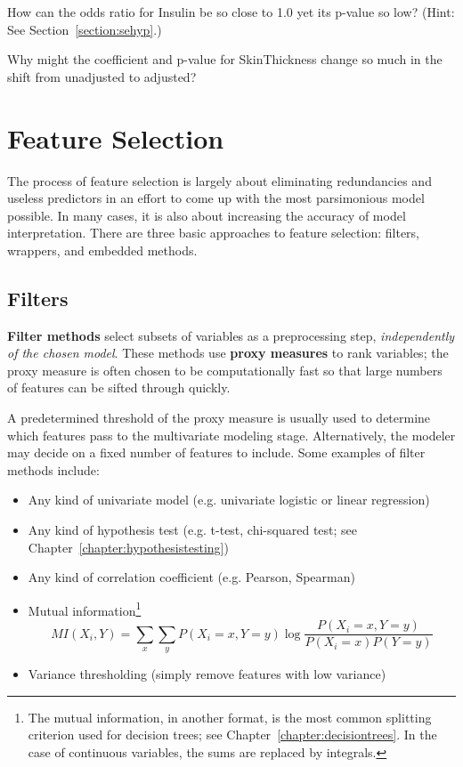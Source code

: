 \begin{question}{}
How can the odds ratio for Insulin be so close to 1.0 yet its p-value so low? (Hint: See Section~\ref{section:sehyp}.)
\end{question}

\begin{question}{}
Why might the coefficient and p-value for SkinThickness change so much in the shift from unadjusted to adjusted? 
\end{question}



\section{Feature Selection}

The process of feature selection is largely about eliminating redundancies and useless predictors in an effort to come up with the most parsimonious model possible. In many cases, it is also about increasing the accuracy of model interpretation. There are three basic approaches to feature selection: filters, wrappers, and embedded methods. 

\subsection{Filters}

\textbf{Filter methods} select subsets of variables as a preprocessing step, \emph{independently of the chosen model}. These methods use \textbf{proxy measures} to rank variables; the proxy measure is often chosen to be computationally fast so that large numbers of features can be sifted through quickly.

A predetermined threshold of the proxy measure is usually used to determine which features pass to the multivariate modeling stage. Alternatively, the modeler may decide on a fixed number of features to include. Some examples of filter methods include:

\begin{itemize}
\item Any kind of univariate model (e.g. univariate logistic or linear regression)
\item Any kind of hypothesis test (e.g. t-test, chi-squared test; see Chapter~\ref{chapter:hypothesistesting})
\item Any kind of correlation coefficient (e.g. Pearson, Spearman)
\item Mutual information\footnote{The mutual information, in another format, is the most common splitting criterion used for decision trees; see Chapter~\ref{chapter:decisiontrees}. In the case of continuous variables, the sums are replaced by integrals.} 
$$ MI(X_i,Y) = \sum_x \sum_y P(X_i = x, Y = y) \log \frac{P(X_i = x, Y = y)}{P(X_i = x) P(Y = y)} $$
\item Variance thresholding (simply remove features with low variance)
\end{itemize}

